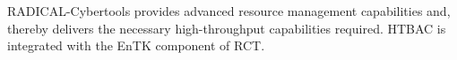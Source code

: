 RADICAL-Cybertools provides advanced resource management capabilities and,
thereby delivers the necessary high-throughput capabilities required. HTBAC is
integrated with the EnTK component of RCT. 


